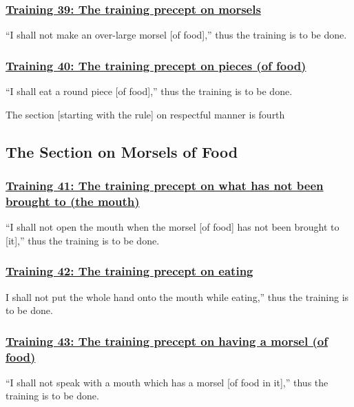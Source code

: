 \subsubsection*{\hyperref[sekh39]{Training 39: The training precept on morsels}}
\label{training39}
``I shall not make an over-large morsel [of food],'' thus the training is to be done.



\subsubsection*{\hyperref[sekh40]{Training 40: The training precept on pieces (of food)}}
\label{training40}
``I shall eat a round piece [of food],'' thus the training is to be done.

\begin{center}
	The section [starting with the rule] on respectful manner is fourth
\end{center}



\setsubsecheadstyle{\subsectionFmt}
\subsection{The Section on Morsels of Food}

\subsubsection*{\hyperref[sekh41]{Training 41: The training precept on what has not been brought to (the mouth)}}
\label{training41}
``I shall not open the mouth when the morsel [of food] has not been brought to [it],'' thus the training is to be done.



\subsubsection*{\hyperref[sekh42]{Training 42: The training precept on eating}}
\label{training42}
I shall not put the whole hand onto the mouth while eating,'' thus the training is to be done.



\subsubsection*{\hyperref[sekh43]{Training 43: The training precept on having a morsel (of food)}}
\label{training43}
``I shall not speak with a mouth which has a morsel [of food in it],'' thus the training is to be done.



